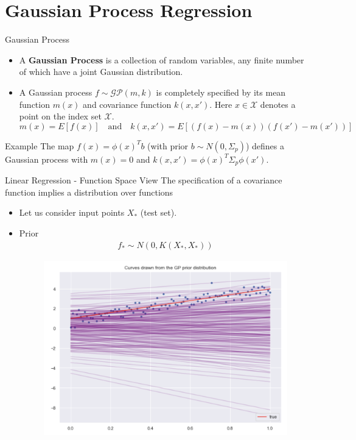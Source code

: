 \documentclass[10pt]{beamer}
\begin{document}
\section{Gaussian Process Regression}


\begin{frame}{Gaussian Process}
\begin{itemize}
\item A {\bf Gaussian Process} is a collection of random variables, any finite number of which have a joint Gaussian distribution. \\
\item A Gaussian process $f \sim \mathcal{GP}(m, k)$ is completely specified by its mean function $m(x)$ and covariance function $k(x, x')$. Here $x \in \mathcal{X}$ denotes a point on the index set $\mathcal{X}$.
$$
m(x) = E[f(x)]
\quad
\text{and}
\quad
k(x, x') = E[(f(x) - m(x))(f(x') - m(x'))]
$$
\end{itemize}

\begin{block}{Example}
The map $f(x) = \phi(x)^T b $ (with prior $b\sim N(0, \Sigma_p)$) defines a Gaussian process with $m(x)=0$ and $k(x, x') = \phi(x)^T\Sigma_p\phi(x')$. 
\end{block}
\end{frame}

\begin{frame}{Linear Regression - Function Space View}
{The specification of a covariance function implies a distribution over functions}
\begin{itemize}
\item Let us consider input points $X_*$ (test set).
\item Prior
\begin{align*}
f_* \sim N(0, K(X_*,X_* ))
\end{align*}
\begin{center}
\begin{figure}
\includegraphics[scale=0.22]{images/gp_lin_prior.png} 
\end{figure}
\end{center}
\end{itemize}
\end{frame}
\end{document}

